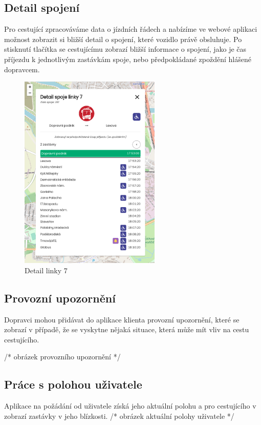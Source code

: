 \subsection{Detail spojení}
Pro cestující zpracováváme data o jízdních řádech a nabízíme ve webové aplikaci možnost zobrazit si bližší detail o spojení, které vozidlo právě obsluhuje.
Po stisknutí tlačítka se cestujícímu zobrazí bližší informace o spojení, jako je čas příjezdu k jednotlivým zastávkám spoje, nebo předpokládané zpoždění hlášené dopravcem.
\par
\begin{figure}[h]
    \centering
    \includegraphics[width=0.6\textwidth]{images/global_pce_con_detail_7.png}
    \caption{Detail linky 7}

\end{figure}
\subsection{Provozní upozornění}
Dopravci mohou přidávat do aplikace klienta provozní upozornění, které se zobrazí v případě, že se vyskytne nějaká situace, která může mít vliv na cestu cestujícího.\par
/* obrázek provozního upozornění */
\subsection{Práce s polohou uživatele}
Aplikace na požádání od uživatele získá jeho aktuální polohu a pro cestujícího v zobrazí zastávky v jeho blízkosti.
/* obrázek aktuální polohy uživatele */
